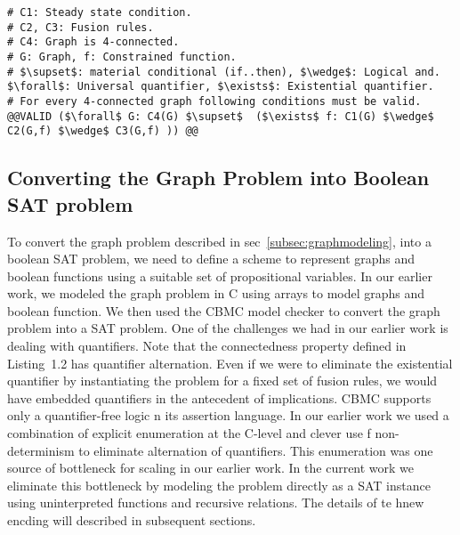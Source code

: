 \begin{lstlisting}[mathescape,
  breaklines,
  rulecolor=\color{black},
  frame=single, 
  caption= \textbf{Maximal Connectedness (LGC) Property.},
  moredelim={[is][keywordstyle]{@@}{@@}}
] 
# C1: Steady state condition.
# C2, C3: Fusion rules.
# C4: Graph is 4-connected.
# G: Graph, f: Constrained function.
# $\supset$: material conditional (if..then), $\wedge$: Logical and.
$\forall$: Universal quantifier, $\exists$: Existential quantifier.
# For every 4-connected graph following conditions must be valid.  
@@VALID ($\forall$ G: C4(G) $\supset$  ($\exists$ f: C1(G) $\wedge$ C2(G,f) $\wedge$ C3(G,f) )) @@

\end{lstlisting} 

\subsection{Converting the Graph Problem into Boolean SAT problem}
\label{subsec:satproblem}
To convert the graph problem described in sec~\ref{subsec:graphmodeling}, into a boolean SAT problem, we need to define a scheme to represent graphs and boolean functions using a suitable set of propositional variables.  In our earlier work, we modeled the graph problem in C using arrays to model graphs and boolean function.  We then used the CBMC model checker to convert the graph problem into a SAT problem.  One of the challenges we had in our earlier work is dealing with quantifiers.  Note that the connectedness property defined in Listing~1.2 has quantifier alternation.  Even if we were to eliminate the existential quantifier by instantiating the problem for a fixed set of fusion rules, we would have embedded quantifiers in the antecedent of implications.   CBMC supports only a quantifier-free logic n its assertion language.  In our earlier work we used a combination of explicit enumeration at the C-level and clever use f non-determinism to eliminate alternation of quantifiers.  This enumeration was one source of bottleneck for scaling in our earlier work.  In the current work we eliminate this bottleneck by modeling the problem directly as a SAT instance using uninterpreted functions and recursive relations.  The details of te hnew encding will described in subsequent sections.


